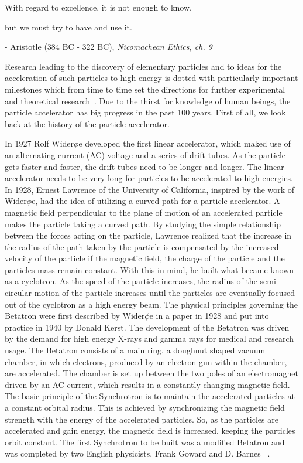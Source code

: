\centerline{With regard to excellence, it is not enough to know,} 
\centerline{but we must try to have and use it.}
\centerline{- Aristotle (384 BC - 322 BC), \textit{Nicomachean Ethics, ch. 9}}

\vspace{3ex}
Research leading to the discovery of elementary particles and to ideas for the acceleration of such particles to high energy is dotted with particularly important milestones which from time to time set the directions for further experimental and theoretical research~\cite{wiedemann_particle_2015}. Due to the thirst for knowledge of human beings, the particle accelerator has big progress in the past 100 years. First of all, we look back at the history of the particle accelerator.

In 1927 Rolf Wider$\phi$e developed the first linear accelerator, which maked use of an alternating current (AC) voltage and a series of drift tubes. As the particle gets faster and faster, the drift tubes need to be longer and longer. The linear accelerator needs to be very long for particles to be accelerated to high energies. In 1928, Ernest Lawrence of the University of California, inspired by the work of Wider$\phi$e, had the idea of utilizing a curved path for a particle accelerator. A magnetic field perpendicular to the plane of motion of an accelerated particle makes the particle taking a curved path. By studying the simple relationship between the forces acting on the particle, Lawrence realized that the increase in the radius of the path taken by the particle is compensated by the increased velocity of the particle if the magnetic field, the charge of the particle and the particles mass remain constant. With this in mind, he built what became known as a cyclotron. As the speed of the particle increases, the radius of the semi-circular motion of the particle increases until the particles are eventually focused out of the cyclotron as a high energy beam. The physical principles governing the Betatron were first described by Wider$\phi$e in a paper in 1928 and put into practice in 1940 by Donald Kerst. The development of the Betatron was driven by the demand for high energy X-rays and gamma rays for medical and research usage. The Betatron consists of a main ring, a doughnut shaped vacuum chamber, in which electrons, produced by an electron gun within the chamber, are accelerated. The chamber is set up between the two poles of an electromagnet driven by an AC current, which results in a constantly changing magnetic field. The basic principle of the Synchrotron is to maintain the accelerated particles at a constant orbital radius. This is achieved by synchronizing the magnetic field strength with the energy of the accelerated particles. So, as the particles are accelerated and gain energy, the magnetic field is increased, keeping the particles orbit constant. The first Synchrotron to be built was a modified Betatron and was completed by two English physicists, Frank Goward and D. Barnes ~\cite{_accelerators_????}.

